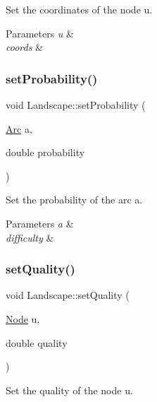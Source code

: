 Set the coordinates of the node u. 


\begin{DoxyParams}{Parameters}
{\em u} & \\
\hline
{\em coords} & \\
\hline
\end{DoxyParams}
\mbox{\label{class_landscape_abf8fb4b7e4185c9f876aa3afc39d1331}} 
\subsubsection{\texorpdfstring{set\+Probability()}{setProbability()}}
{\footnotesize\ttfamily void Landscape\+::set\+Probability (\begin{DoxyParamCaption}\item[{\hyperlink{classconcepts_1_1_abstract_landscape_a0966623f028fe50ac9a3ae114dcf2672}{Arc}}]{a,  }\item[{double}]{probability }\end{DoxyParamCaption})}



Set the probability of the arc a. 


\begin{DoxyParams}{Parameters}
{\em a} & \\
\hline
{\em difficulty} & \\
\hline
\end{DoxyParams}
\mbox{\label{class_landscape_aac673fb693ff152251109c07f60f3672}} 
\subsubsection{\texorpdfstring{set\+Quality()}{setQuality()}}
{\footnotesize\ttfamily void Landscape\+::set\+Quality (\begin{DoxyParamCaption}\item[{\hyperlink{classconcepts_1_1_abstract_landscape_a7c2f90fb9f42302f1af84a59f4df4b91}{Node}}]{u,  }\item[{double}]{quality }\end{DoxyParamCaption})}



Set the quality of the node u. 


